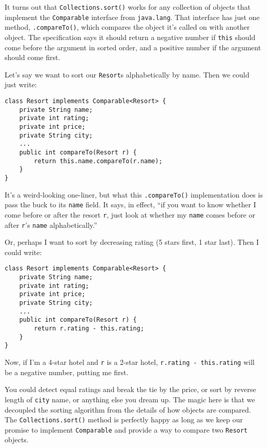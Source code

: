 It turns out that \texttt{Collections.sort()} works for any collection of
objects that implement the \texttt{Comparable} interface from
\texttt{java.lang}. That interface has just one method, \texttt{.compareTo()},
which compares the object it's called on with another object. The
specification says it should return a negative number if \texttt{this} should
come before the argument in sorted order, and a positive number if the
argument should come first.

Let's say we want to sort our \texttt{Resort}s alphabetically by name. Then we
could just write:

\begin{Verbatim}[fontsize=\small,samepage=true,frame=single]
class Resort implements Comparable<Resort> {
    private String name;
    private int rating;
    private int price;
    private String city;
    ...
    public int compareTo(Resort r) {
        return this.name.compareTo(r.name);
    }
}
\end{Verbatim}

It's a weird-looking one-liner, but what this \texttt{.compareTo()}
implementation does is pass the buck to its \texttt{name} field. It says, in
effect, ``if you want to know whether I come before or after the resort
\texttt{r}, just look at whether my \texttt{name} comes before or after
\texttt{r}'s \texttt{name} alphabetically.''

Or, perhaps I want to sort by decreasing rating (5 stars first, 1 star last).
Then I could write:

\begin{Verbatim}[fontsize=\small,samepage=true,frame=single]
class Resort implements Comparable<Resort> {
    private String name;
    private int rating;
    private int price;
    private String city;
    ...
    public int compareTo(Resort r) {
        return r.rating - this.rating;
    }
}
\end{Verbatim}

Now, if I'm a 4-star hotel and \texttt{r} is a 2-star hotel, \texttt{r.rating
- this.rating} will be a negative number, putting me first.

You could detect equal ratings and break the tie by the price, or sort by
reverse length of \texttt{city} name, or anything else you dream up. The magic
here is that we decoupled the sorting algorithm from the details of how
objects are compared. The \texttt{Collections.sort()} method is perfectly
happy as long as we keep our promise to implement \texttt{Comparable} and
provide a way to compare two \texttt{Resort} objects.



